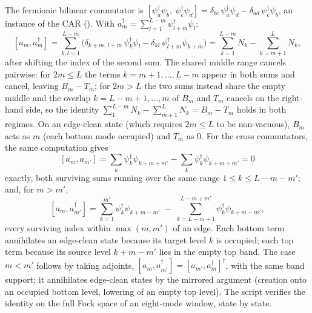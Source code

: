 The fermionic bilinear commutator is $[\psi_a^\dagger\psi_b,\ \psi_c^\dagger\psi_d] = \delta_{bc}\,\psi_a^\dagger\psi_d - \delta_{ad}\,\psi_c^\dagger\psi_b$, an instance of the CAR (). With $a_m^\dagger = \sum_{l=1}^{L-m}\psi_{l+m}^\dagger\psi_l$:
\[
[a_m, a_m^\dagger] = \sum_{k,l=1}^{L-m}\bigl(\delta_{k+m,\,l+m}\,\psi_k^\dagger\psi_l - \delta_{k l}\,\psi_{l+m}^\dagger\psi_{k+m}\bigr)
= \sum_{k=1}^{L-m} N_k - \sum_{k=m+1}^{L} N_k ,
\]
after shifting the index of the second sum. The shared middle range cancels pairwise: for $2m \le L$ the terms $k = m{+}1, \dots, L{-}m$ appear in both sums and cancel, leaving $B_m - T_m$; for $2m > L$ the two sums instead share the empty middle and the overlap $k = L{-}m{+}1, \dots, m$ of $B_m$ and $T_m$ cancels on the right-hand side, so the identity $\sum_{1}^{L-m} N_k - \sum_{m+1}^{L} N_k = B_m - T_m$ holds in both regimes. On an edge-clean state (which requires $2m \le L$ to be non-vacuous), $B_m$ acts as $m$ (each bottom mode occupied) and $T_m$ as $0$. For the cross commutators, the same computation gives
\[
[a_m, a_{m'}] = \sum_{k}\psi_k^\dagger\psi_{k+m+m'} - \sum_{k}\psi_k^\dagger\psi_{k+m+m'} = 0
\]
exactly, both surviving sums running over the same range $1 \le k \le L - m - m'$; and, for $m > m'$,
\[
[a_m, a_{m'}^\dagger] = \sum_{k=1}^{m'}\psi_k^\dagger\psi_{k+m-m'} \;-\; \sum_{k=L-m+1}^{L-m+m'}\psi_k^\dagger\psi_{k+m-m'},
\]
every surviving index within $\max(m,m')$ of an edge. Each bottom term annihilates an edge-clean state because its target level $k$ is occupied; each top term because its source level $k + m - m'$ lies in the empty top band. The case $m < m'$ follows by taking adjoints, $[a_m, a_{m'}^\dagger] = [a_{m'}, a_m^\dagger]^\dagger$, with the same band support; it annihilates edge-clean states by the mirrored argument (creation onto an occupied bottom level, lowering of an empty top level). The script verifies the identity on the full Fock space of an eight-mode window, state by state.
